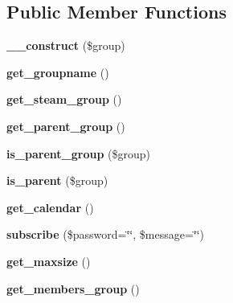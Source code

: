\subsection*{Public Member Functions}
\begin{DoxyCompactItemize}
\item 
\hypertarget{classkoala__group_a2cc6bf4a8748d09c161efbca1a5e2c9a}{
{\bfseries \_\-\_\-construct} (\$group)}
\label{classkoala__group_a2cc6bf4a8748d09c161efbca1a5e2c9a}

\item 
\hypertarget{classkoala__group_a87d9b34194ab9b2b6bf5c87ffb2d1e94}{
{\bfseries get\_\-groupname} ()}
\label{classkoala__group_a87d9b34194ab9b2b6bf5c87ffb2d1e94}

\item 
\hypertarget{classkoala__group_ab4e2a9fcc5c5bb3e6e7c6a960b377d4f}{
{\bfseries get\_\-steam\_\-group} ()}
\label{classkoala__group_ab4e2a9fcc5c5bb3e6e7c6a960b377d4f}

\item 
\hypertarget{classkoala__group_a9f8f3993ee3fa02d7ca81438b22ee3aa}{
{\bfseries get\_\-parent\_\-group} ()}
\label{classkoala__group_a9f8f3993ee3fa02d7ca81438b22ee3aa}

\item 
\hypertarget{classkoala__group_a2e382b3baaec25dc0cc48cbdbb4b4293}{
{\bfseries is\_\-parent\_\-group} (\$group)}
\label{classkoala__group_a2e382b3baaec25dc0cc48cbdbb4b4293}

\item 
\hypertarget{classkoala__group_a7d71b52986775cfb1f5d76a74fc5d762}{
{\bfseries is\_\-parent} (\$group)}
\label{classkoala__group_a7d71b52986775cfb1f5d76a74fc5d762}

\item 
\hypertarget{classkoala__group_adbd28edbaee31ecba7811c443d774cc4}{
{\bfseries get\_\-calendar} ()}
\label{classkoala__group_adbd28edbaee31ecba7811c443d774cc4}

\item 
\hypertarget{classkoala__group_a1ba368e60e2ccd7850af4447d5c1afac}{
{\bfseries subscribe} (\$password=\char`\"{}\char`\"{}, \$message=\char`\"{}\char`\"{})}
\label{classkoala__group_a1ba368e60e2ccd7850af4447d5c1afac}

\item 
\hypertarget{classkoala__group_a336bf5e6f3650edf2b6c9d09c7bcfff1}{
{\bfseries get\_\-maxsize} ()}
\label{classkoala__group_a336bf5e6f3650edf2b6c9d09c7bcfff1}

\item 
\hypertarget{classkoala__group_a5d121023623a5d496c465652fe29493a}{
{\bfseries get\_\-members\_\-group} ()}
\label{classkoala__group_a5d121023623a5d496c465652fe29493a}


\end{DoxyCompactItemize}
